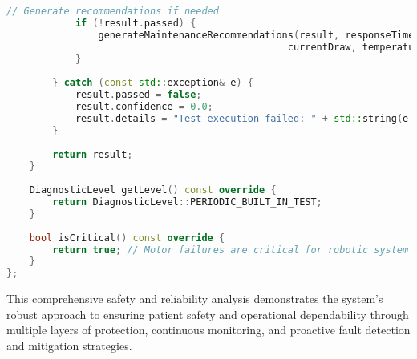 \begin{lstlisting}[language=C++, caption=Self-Diagnostic System]
            // Generate recommendations if needed
            if (!result.passed) {
                generateMaintenanceRecommendations(result, responseTime, 
                                                 currentDraw, temperature, vibration);
            }
            
        } catch (const std::exception& e) {
            result.passed = false;
            result.confidence = 0.0;
            result.details = "Test execution failed: " + std::string(e.what());
        }
        
        return result;
    }
    
    DiagnosticLevel getLevel() const override {
        return DiagnosticLevel::PERIODIC_BUILT_IN_TEST;
    }
    
    bool isCritical() const override {
        return true; // Motor failures are critical for robotic system
    }
};
\end{lstlisting}

This comprehensive safety and reliability analysis demonstrates the system's robust approach to ensuring patient safety and operational dependability through multiple layers of protection, continuous monitoring, and proactive fault detection and mitigation strategies.
